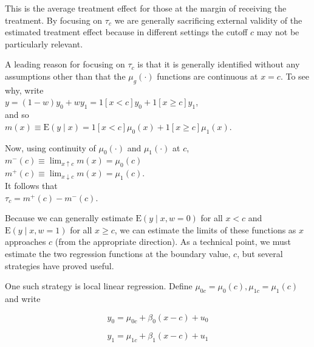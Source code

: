 \documentclass[10pt]{article}
\begin{document}
This is the average treatment effect for those at the margin of receiving the treatment. By focusing on $\tau_{c}$ we are generally sacrificing external validity of the estimated treatment effect because in different settings the cutoff $c$ may not be particularly relevant.

A leading reason for focusing on $\tau_{c}$ is that it is generally identified without any assumptions other than that the $\mu_{g}(\cdot)$ functions are continuous at $x=c$. To see why, write\\
$y=(1-w) y_{0}+w y_{1}=1[x<c] y_{0}+1[x \geq c] y_{1}$,\\
and so\\
$m(x) \equiv \mathrm{E}(y \mid x)=1[x<c] \mu_{0}(x)+1[x \geq c] \mu_{1}(x)$.

Now, using continuity of $\mu_{0}(\cdot)$ and $\mu_{1}(\cdot)$ at $c$,\\
$m^{-}(c) \equiv \lim _{x \uparrow c} m(x)=\mu_{0}(c)$\\
$m^{+}(c) \equiv \lim _{x \downarrow c} m(x)=\mu_{1}(c)$.\\
It follows that\\
$\tau_{c}=m^{+}(c)-m^{-}(c)$.

Because we can generally estimate $\mathrm{E}(y \mid x, w=0)$ for all $x<c$ and $\mathrm{E}(y \mid x, w=1)$ for all $x \geq c$, we can estimate the limits of these functions as $x$ approaches $c$ (from the appropriate direction). As a technical point, we must estimate the two regression functions at the boundary value, $c$, but several strategies have proved useful.

One such strategy is local linear regression. Define $\mu_{0 c}=\mu_{0}(c), \mu_{1 c}=\mu_{1}(c)$ and write


\begin{equation*}
y_{0}=\mu_{0 c}+\beta_{0}(x-c)+u_{0} \tag{21.99}
\end{equation*}



\begin{equation*}
y_{1}=\mu_{1 c}+\beta_{1}(x-c)+u_{1} \tag{21.100}
\end{equation*}
\end{document}
